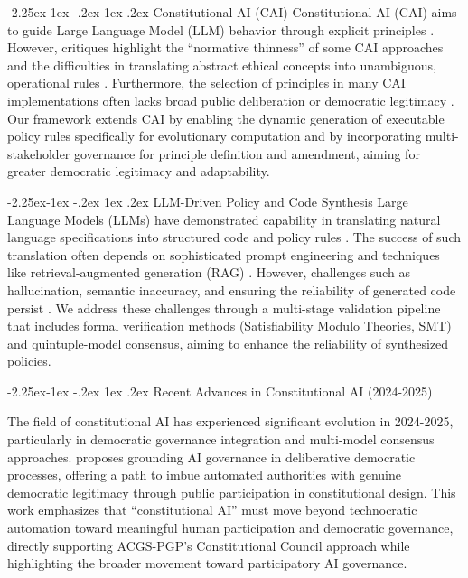 \documentclass[manuscript,screen,9pt]{acmart}
\makeatletter
\renewcommand\subsection{\@startsection{subsection}{2}{\z@}%
  {-2.25ex\@plus -1ex \@minus -.2ex}%
  {1ex \@plus .2ex}%
  {\normalfont\large\bfseries}}
\makeatother
\begin{document}
\subsection{Constitutional AI (CAI)}
Constitutional AI (CAI) aims to guide Large Language Model (LLM) behavior through explicit principles \cite{Bai2025ConstitutionalAI}. However, critiques highlight the ``normative thinness'' of some CAI approaches and the difficulties in translating abstract ethical concepts into unambiguous, operational rules \cite{DigiCon2025ConstitutionalAIThin, ChaconMenke2025CAISmallLLMs}. Furthermore, the selection of principles in many CAI implementations often lacks broad public deliberation or democratic legitimacy \cite{Hwang2025PublicCAI}. Our framework extends CAI by enabling the dynamic generation of executable policy rules specifically for evolutionary computation and by incorporating multi-stakeholder governance for principle definition and amendment, aiming for greater democratic legitimacy and adaptability.

\subsection{LLM-Driven Policy and Code Synthesis}
\label{subsec:related_llm_synthesis}
Large Language Models (LLMs) have demonstrated capability in translating natural language specifications into structured code and policy rules \cite{Almulla2024EmergenceLLMPolicy, ResearchGate2025AutoPAC, Li2025VeriCoder}. The success of such translation often depends on sophisticated prompt engineering and techniques like retrieval-augmented generation (RAG) \cite{AnalyticsVidhya2024PromptingTechniques, arXiv2025FutureWorkRAG}. However, challenges such as hallucination, semantic inaccuracy, and ensuring the reliability of generated code persist \cite{AAAI2025CodeHalu, Taeihagh2025Governing}. We address these challenges through a multi-stage validation pipeline that includes formal verification methods (Satisfiability Modulo Theories, SMT) and quintuple-model consensus, aiming to enhance the reliability of synthesized policies.

\subsection{Recent Advances in Constitutional AI (2024-2025)}
\label{subsec:recent_constitutional_ai}

The field of constitutional AI has experienced significant evolution in 2024-2025, particularly in democratic governance integration and multi-model consensus approaches. \citet{Abiri2024PublicConstitutionalAI} proposes grounding AI governance in deliberative democratic processes, offering a path to imbue automated authorities with genuine democratic legitimacy through public participation in constitutional design. This work emphasizes that ``constitutional AI'' must move beyond technocratic automation toward meaningful human participation and democratic governance, directly supporting ACGS-PGP's Constitutional Council approach while highlighting the broader movement toward participatory AI governance.
\end{document}
